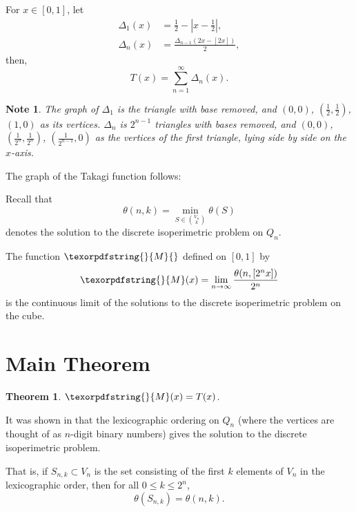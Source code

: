 \documentclass[12pt]{ucthesis}
\theoremstyle{plain}
\newtheorem{theorem}{Theorem}
\newtheorem*{note}{Note}
\theoremstyle{definition}
\newcommand{\takagi}{
  \texorpdfstring{\protect}{M}
}
\begin{document}
For $x \in [0, 1]$, let
\begin{align*}
\Delta_1(x) & = \frac{1}{2} - \left|x - \frac{1}{2}\right|, \\
\Delta_n(x) & = \frac{\Delta_{n - 1}(2 x - [2 x])}{2},
\end{align*}
then,
\begin{equation*}
T(x) = \sum_{n = 1}^\infty \Delta_n(x).
\end{equation*}

\begin{note}
The graph of $\Delta_1$ is the triangle with base removed,
and $(0, 0)$, $(\frac{1}{2}, \frac{1}{2})$, $(1, 0)$ as its vertices.
$\Delta_n$ is $2^{n - 1}$ triangles with bases removed,
and $(0, 0)$, $(\frac{1}{2^n}, \frac{1}{2^n})$, $(\frac{1}{2^{n - 1}}, 0)$
as the vertices of the first triangle, lying side by side on the $x$-axis.
\end{note}

The graph of the Takagi function follows:
\begin{figure}[h!]
	\centering
	
\end{figure}

Recall that
\begin{equation*}
\theta(n, k) = \min_{S \in \binom{V_n}{k}} \theta(S)
\end{equation*}
denotes the solution to the discrete isoperimetric problem on $Q_n$.

The function $\takagi{}$ defined on $[0, 1]$ by
\begin{equation*}
\takagi(x) = \lim_{n \rightarrow \infty} \frac{\theta(n, [2^n x])}{2^n}
\end{equation*}
is the continuous limit of the solutions to the discrete isoperimetric problem on the cube.

\section{Main Theorem}
\label{Section 3.2}

\begin{theorem}
\label{Theorem 1}
$\takagi(x) = T(x)$.
\end{theorem}

It was shown in \cite{Harper.1964} that the lexicographic ordering on $Q_n$
(where the vertices are thought of as $n$-digit binary numbers)
gives the solution to the discrete isoperimetric problem.

That is, if $S_{n, k} \subset V_n$ is the set consisting of the first $k$ elements of $V_n$
in the lexicographic order, then for all $0 \le k \le 2^n$,
\begin{equation*}
\theta(S_{n, k}) = \theta(n, k).
\end{equation*}
\end{document}
